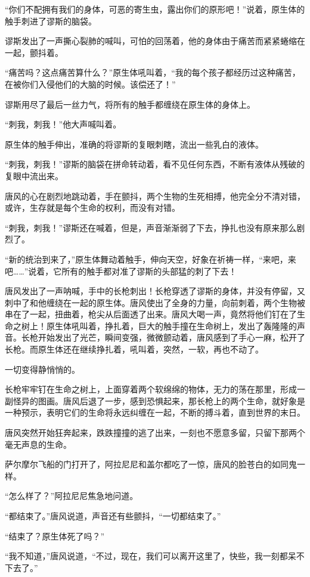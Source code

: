 “你们不配拥有我们的身体，可恶的寄生虫，露出你们的原形吧！”说着，原生体的触手刺进了谬斯的脑袋。

谬斯发出了一声撕心裂肺的喊叫，可怕的回荡着，他的身体由于痛苦而紧紧蜷缩在一起，颤抖着。

“痛苦吗？这点痛苦算什么？”原生体吼叫着，“我的每个孩子都经历过这种痛苦，在被你们入侵他们的大脑的时候。该偿还了！”

谬斯用尽了最后一丝力气，将所有的触手都缠绕在原生体的身体上。

“刺我，刺我！”他大声喊叫着。

原生体的触手伸出，准确的将谬斯的复眼刺瞎，流出一些乳白的液体。

“刺我，刺我！”谬斯的脑袋在拼命转动着，看不见任何东西，不断有液体从残破的复眼中流出来。

唐风的心在剧烈地跳动着，手在颤抖，两个生物的生死相搏，他完全分不清对错，或许，生存就是每个生命的权利，而没有对错。

“刺我，刺我！”谬斯还在喊着，但是，声音渐渐弱了下去，挣扎也没有原来那么剧烈了。

“新的统治到来了，”原生体舞动着触手，伸向天空，好象在祈祷一样，“来吧，来吧……”说着，它所有的触手都对准了谬斯的头部猛的刺了下去！


唐风发出了一声呐喊，手中的长枪刺出！长枪穿透了谬斯的身体，并没有停留，又刺中了和他缠绕在一起的原生体。唐风使出了全身的力量，向前刺着，两个生物被串在了一起，扭曲着，枪尖从后面透了出来。唐风大喝一声，竟然将他们钉在了生命之树上！原生体吼叫着，挣扎着，巨大的触手撞在生命树上，发出了轰隆隆的声音。长枪开始发出了光芒，瞬间变强，微微颤动着，唐风感到了手心一麻，松开了长枪。而原生体还在继续挣扎着，吼叫着，突然，一软，再也不动了。

一切变得静悄悄的。

长枪牢牢钉在生命之树上，上面穿着两个软绵绵的物体，无力的荡在那里，形成一副怪异的图画。唐风后退了一步，感到恐惧起来，那长枪上的两个生命，就好象是一种预示，表明它们的生命将永远纠缠在一起，不断的搏斗着，直到世界的末日。

唐风突然开始狂奔起来，跌跌撞撞的逃了出来，一刻也不愿意多留，只留下那两个毫无声息的生命。

萨尔摩尔飞船的门打开了，阿拉尼尼和盖尔都吃了一惊，唐风的脸苍白的如同鬼一样。

“怎么样了？”阿拉尼尼焦急地问道。

“都结束了。”唐风说道，声音还有些颤抖，“一切都结束了。”

“结束了？原生体死了吗？”

“我不知道，”唐风说道，“不过，现在，我们可以离开这里了，快些，我一刻都呆不下去了。”

